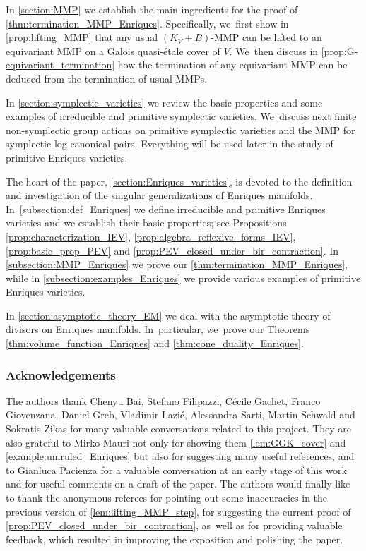 \documentclass[JEP,XML,SOM,Unicode,published]{cedram}
\theoremstyle{plain}
\theoremstyle{definition}
\begin{document}
In \autoref{section:MMP} we establish the main ingredients for the proof of \autoref{thm:termination_MMP_Enriques}. Specifically, we~first show in \autoref{prop:lifting_MMP} that any usual $(K_V + B)$-MMP can be lifted to an equivariant MMP on a Galois quasi-étale cover of $V$. We~then discuss in \autoref{prop:G-equivariant_termination} how the termination of any equivariant MMP can be deduced from the termination of usual MMPs.

In \autoref{section:symplectic_varieties} we review the basic properties and some examples of irreducible and primitive symplectic varieties. We~discuss next finite non-symplectic group actions on primitive symplectic varieties and the MMP for symplectic log canonical pairs. Everything will be used later in the study of primitive Enriques varieties.

The heart of the paper, \autoref{section:Enriques_varieties}, is devoted to the definition and investigation of the singular generalizations of Enriques manifolds. In~\autoref{subsection:def_Enriques} we define irreducible and primitive Enriques varieties and we establish their basic properties; see Propositions \ref{prop:characterization_IEV}, \ref{prop:algebra_reflexive_forms_IEV}, \ref{prop:basic_prop_PEV} and \ref{prop:PEV_closed_under_bir_contraction}.
In \autoref{subsection:MMP_Enriques} we prove our \autoref{thm:termination_MMP_Enriques}, while in \autoref{subsection:examples_Enriques} we provide various examples of primitive Enriques varieties.

In \autoref{section:asymptotic_theory_EM} we deal with the asymptotic theory of divisors on Enriques manifolds. In~particular, we~prove our Theorems \ref{thm:volume_function_Enriques} and \ref{thm:cone_duality_Enriques}.

\subsubsection*{Acknowledgements}
The authors thank Chenyu Bai, Stefano Filipazzi, Cécile \hbox{Gachet}, Franco Giovenzana, Daniel Greb, Vladimir Lazi\'c, Alessandra Sarti, Martin Schwald and Sokratis Zikas for many valuable conversations related to this project. They are also grateful to Mirko Mauri not only for showing them \autoref{lem:GGK_cover} and \autoref{example:uniruled_Enriques} but also for suggesting many useful references, and to Gianluca Pacienza for a valuable conversation at an early stage of this work and for useful comments on a draft of the paper. The authors would finally like to thank the anonymous referees for pointing out some inaccuracies in the previous version of \autoref{lem:lifting_MMP_step}, for suggesting the current proof of \autoref{prop:PEV_closed_under_bir_contraction}, as~well as for providing valuable feedback, which resulted in improving the exposition and polishing the paper.
\end{document}
